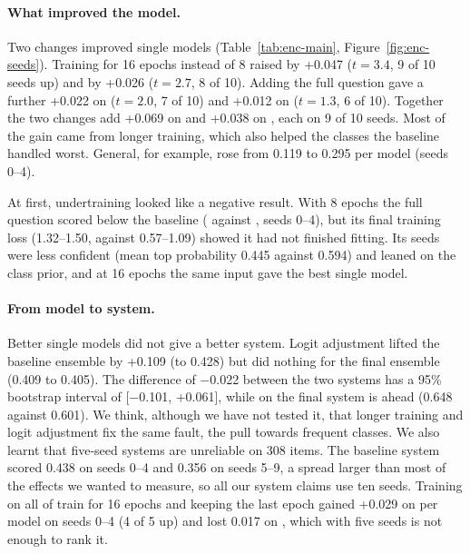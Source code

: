\paragraph{What improved the model.}
Two changes improved single models (Table~\ref{tab:enc-main},
Figure~\ref{fig:enc-seeds}). Training for 16 epochs instead of 8 raised \Stwo{} by
+0.047 ($t=3.4$, 9 of 10 seeds up) and \Sone{} by +0.026 ($t=2.7$, 8 of 10). Adding the
full question gave a further +0.022 on \Stwo{} ($t=2.0$, 7 of 10) and +0.012 on \Sone{}
($t=1.3$, 6 of 10). Together the two changes add +0.069 on \Stwo{} and +0.038 on \Sone{},
each on 9 of 10 seeds. Most of the gain came from longer training, which also helped the
classes the baseline handled worst. General, for example, rose from 0.119 to 0.295 per
model (seeds 0--4).

\FigureEncSeeds

At first, undertraining looked like a negative result. With 8 epochs the full question
scored below the baseline ( against , seeds 0--4),
but its final training loss (1.32--1.50, against 0.57--1.09) showed it had not finished
fitting. Its seeds were less confident (mean top probability 0.445 against 0.594) and
leaned on the class prior, and at 16 epochs the same input gave the best single model.

\paragraph{From model to system.}
Better single models did not give a better \Stwo{} system. Logit adjustment lifted the
baseline ensemble by +0.109 (to 0.428) but did nothing for the final ensemble (0.409 to
0.405). The \Stwo{} difference of $-$0.022 between the two systems has a 95\% bootstrap
interval of [$-$0.101, +0.061], while on \Sone{} the final system is ahead (0.648 against
0.601). We think, although we have not tested it, that longer training and logit
adjustment fix the same fault, the pull towards frequent classes. We also learnt that
five-seed systems are unreliable on 308 items. The baseline system scored 0.438 on seeds
0--4 and 0.356 on seeds 5--9, a spread larger than most of the effects we wanted to
measure, so all our system claims use ten seeds. Training on all of train for 16 epochs
and keeping the last epoch gained +0.029 on \Stwo{} per model on seeds 0--4 (4 of 5 up)
and lost 0.017 on \Sone{}, which with five seeds is not enough to rank it.


